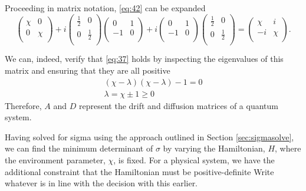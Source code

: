 \documentclass[11pt,a4paper]{article}
\numberwithin{equation}{section}
\begin{document}
	Proceeding in matrix notation, \ref{eq:42} can be expanded	
	\begin{equation*}
	\begin{pmatrix}
	\chi & 0  \\
	0 & \chi \\
	\end{pmatrix} + i\begin{pmatrix}
	\frac{1}{2} & 0  \\
	0 & \frac{1}{2} \\
	\end{pmatrix}\begin{pmatrix}
	0 & 1  \\
	-1 & 0 \\
	\end{pmatrix} + i\begin{pmatrix}
	0 & 1  \\
	-1 & 0 \\
	\end{pmatrix}\begin{pmatrix}
	\frac{1}{2} & 0  \\
	0 & \frac{1}{2} \\
	\end{pmatrix}=
	\begin{pmatrix}
	\chi & i  \\
	-i & \chi \\
	\end{pmatrix}.
	\end{equation*}

	We can, indeed, verify that \ref{eq:37} holds by inspecting the eigenvalues of this matrix and ensuring that they are all positive
	\begin{align*}
	&(\chi- \lambda)(\chi- \lambda) - 1 = 0&\\
	&\lambda = \chi \pm 1 \geq 0&\tag*{as $\chi \geq 1$}
	\end{align*}
	Therefore, $A$ and $D$ represent the drift and diffusion matrices of a quantum system.
	
	Having solved for sigma using the approach outlined in Section \ref{sec:sigmasolve}, we can find the minimum determinant of $\sigma$ by varying the Hamiltonian, $H$, where the environment parameter, $\chi$, is fixed. For a physical system, we have the additional constraint that the Hamiltonian must be positive-definite \color{red}Write whatever is in line with the decision with this earlier\color{black}. 
	
\end{document}
